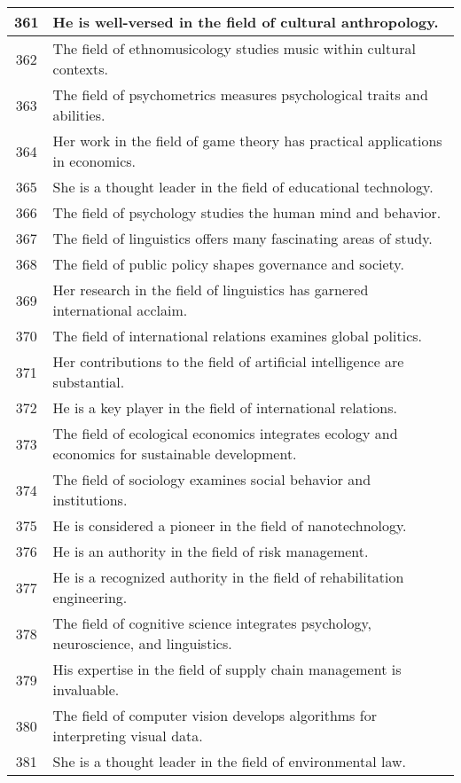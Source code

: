 \begin{longtable}{|c|p{12cm}|}
361 & He is well-versed in the field of cultural anthropology. \\ \hline
362 & The field of ethnomusicology studies music within cultural contexts. \\ \hline
363 & The field of psychometrics measures psychological traits and abilities. \\ \hline
364 & Her work in the field of game theory has practical applications in economics. \\ \hline
365 & She is a thought leader in the field of educational technology. \\ \hline
366 & The field of psychology studies the human mind and behavior. \\ \hline
367 & The field of linguistics offers many fascinating areas of study. \\ \hline
368 & The field of public policy shapes governance and society. \\ \hline
369 & Her research in the field of linguistics has garnered international acclaim. \\ \hline
370 & The field of international relations examines global politics. \\ \hline
371 & Her contributions to the field of artificial intelligence are substantial. \\ \hline
372 & He is a key player in the field of international relations. \\ \hline
373 & The field of ecological economics integrates ecology and economics for sustainable development. \\ \hline
374 & The field of sociology examines social behavior and institutions. \\ \hline
375 & He is considered a pioneer in the field of nanotechnology. \\ \hline
376 & He is an authority in the field of risk management. \\ \hline
377 & He is a recognized authority in the field of rehabilitation engineering. \\ \hline
378 & The field of cognitive science integrates psychology, neuroscience, and linguistics. \\ \hline
379 & His expertise in the field of supply chain management is invaluable. \\ \hline
380 & The field of computer vision develops algorithms for interpreting visual data. \\ \hline
381 & She is a thought leader in the field of environmental law. \\ \hline

\end{longtable}
